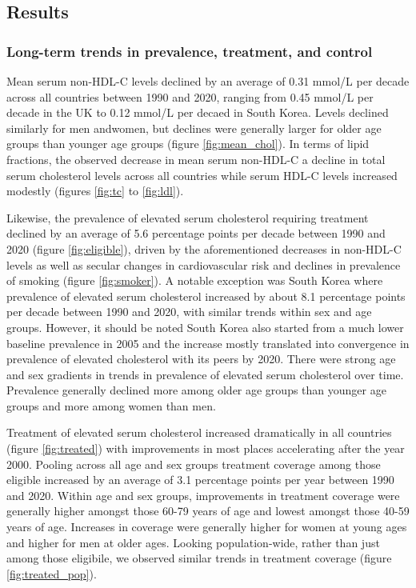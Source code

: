 \documentclass[12pt]{article}
\begin{document}
\begin{refsection}
\section{Results} \label{sec:result}

\subsubsection*{Long-term trends in prevalence, treatment, and control}
Mean serum non-HDL-C levels declined by an average of 0.31 mmol/L per decade across all countries between 1990 and 2020, ranging from 0.45 mmol/L per decade in the UK to 0.12 mmol/L per decaed in South Korea. Levels declined similarly for men andwomen, but declines were generally larger for older age groups than younger age groups (figure \ref{fig:mean_chol}). In terms of lipid fractions, the observed decrease in mean serum non-HDL-C  a decline in total serum cholesterol levels across all countries while serum HDL-C levels increased modestly (figures \ref{fig:tc} to \ref{fig:ldl}).

Likewise, the prevalence of elevated serum cholesterol requiring treatment declined by an average of 5.6 percentage points per decade between 1990 and 2020 (figure \ref{fig:eligible}), driven by the aforementioned decreases in non-HDL-C levels as well as secular changes in cardiovascular risk and declines in prevalence of smoking (figure \ref{fig:smoker}). A notable exception was South Korea where prevalence of elevated serum cholesterol increased by about 8.1 percentage points per decade between 1990 and 2020, with similar trends within sex and age groups. However, it should be noted South Korea also started from a much lower baseline prevalence in 2005 and the increase mostly translated into convergence in prevalence of elevated cholesterol with its peers by 2020. There were strong age and sex gradients in trends in prevalence of elevated serum cholesterol over time. Prevalence generally declined more among older age groups than younger age groups and more among women than men.

Treatment of elevated serum cholesterol increased dramatically in all countries (figure \ref{fig:treated}) with improvements in most places accelerating after the year 2000. Pooling across all age and sex groups treatment coverage among those eligible increased by an average of 3.1 percentage points per year between 1990 and 2020. Within age and sex groups, improvements in treatment coverage were generally higher amongst those 60-79 years of age and lowest amongst those 40-59 years of age. Increases in coverage were generally higher for women at young ages and higher for men at older ages. Looking population-wide, rather than just among those eligibile, we observed similar trends in treatment coverage (figure \ref{fig:treated_pop}).


\end{refsection}
\end{document}
